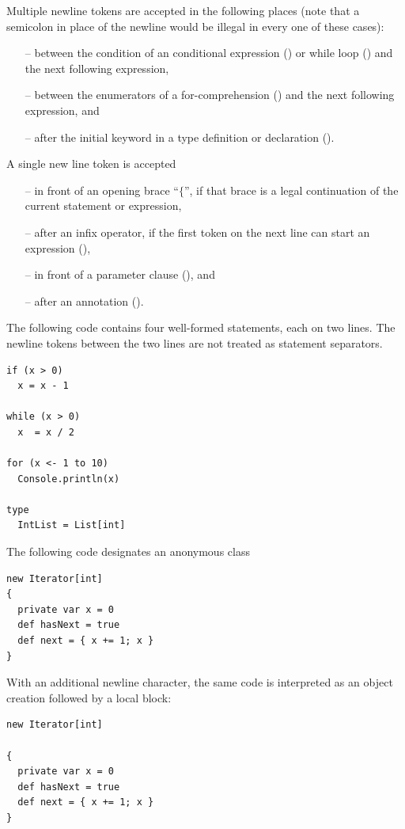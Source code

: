 Multiple newline tokens are accepted in the following places (note
that a semicolon in place of the newline would be illegal in every one
of these cases):
\begin{itemize}
\item[--]
between the condition of an conditional expression
() or while loop () and the next
following expression,
\item[--]
between the enumerators of a for-comprehension ()
and the next following expression, and
\item[--]
after the initial \lstinline@type@ keyword in a type definition or
declaration ().
\end{itemize}
A single new line token is accepted
\begin{itemize}
\item[--] 
  in front of an opening brace ``$\{$'', if that brace is a legal
  continuation of the current statement or expression,
\item[--]
  after an infix operator, if the first token on the next line can
  start an expression (),
\item[--]
  in front of a parameter clause (), and
\item[--]
  after an annotation ().
\end{itemize}  

\example The following code contains four well-formed statements, each
on two lines. The newline tokens between the two lines are not
treated as statement separators.
\begin{lstlisting}
if (x > 0)
  x = x - 1

while (x > 0)
  x  = x / 2

for (x <- 1 to 10)
  Console.println(x)

type
  IntList = List[int]
\end{lstlisting}

\example The following code designates an anonymous class
\begin{lstlisting}
new Iterator[int] 
{
  private var x = 0
  def hasNext = true
  def next = { x += 1; x }
}
\end{lstlisting}

With an additional newline character, the same code is interpreted as
an object creation followed by a local block:

\begin{lstlisting}
new Iterator[int] 

{
  private var x = 0
  def hasNext = true
  def next = { x += 1; x }
}
\end{lstlisting}

